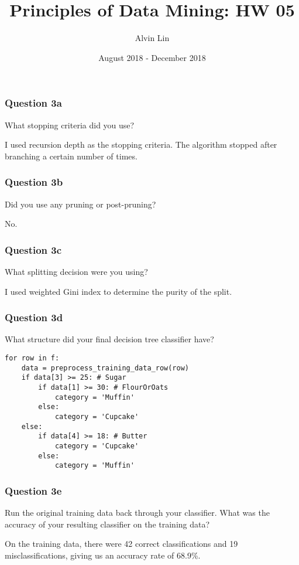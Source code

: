 \documentclass{math}
\title{Principles of Data Mining: HW 05}
\author{Alvin Lin}
\date{August 2018 - December 2018}
\begin{document}
\maketitle

\subsubsection*{Question 3a}
What stopping criteria did you use? \par
I used recursion depth as the stopping criteria. The algorithm stopped after
branching a certain number of times.

\subsubsection*{Question 3b}
Did you use any pruning or post-pruning? \par
No.

\subsubsection*{Question 3c}
What splitting decision were you using? \par
I used weighted Gini index to determine the purity of the split.

\subsubsection*{Question 3d}
What structure did your final decision tree classifier have?
\begin{lstlisting}
for row in f:
    data = preprocess_training_data_row(row)
    if data[3] >= 25: # Sugar
        if data[1] >= 30: # FlourOrOats
            category = 'Muffin'
        else:
            category = 'Cupcake'
    else:
        if data[4] >= 18: # Butter
            category = 'Cupcake'
        else:
            category = 'Muffin'
\end{lstlisting}

\subsubsection*{Question 3e}
Run the original training data back through your classifier. What was the
accuracy of your resulting classifier on the training data? \par
On the training data, there were 42 correct classifications and 19
misclassifications, giving us an accuracy rate of 68.9\%.
\end{document}
